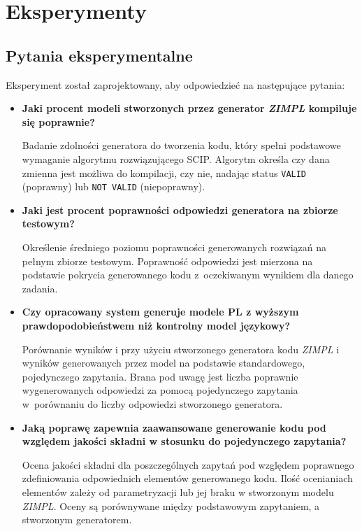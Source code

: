
\chapter{Eksperymenty}\label{ch:experiment}

\section{Pytania eksperymentalne}

Eksperyment został zaprojektowany, aby odpowiedzieć na następujące pytania:
\begin{itemize}
    \item \textbf{Jaki procent modeli stworzonych przez generator  \textit{ZIMPL} kompiluje się poprawnie?}

Badanie zdolności generatora do tworzenia kodu, który spełni podstawowe wymaganie algorytmu rozwiązującego SCIP. Algorytm określa czy dana zmienna jest możliwa do kompilacji, czy nie, nadając status \texttt{VALID} (poprawny) lub \texttt{NOT VALID} (niepoprawny).

    \item \textbf{Jaki jest procent poprawności odpowiedzi generatora na zbiorze testowym?}

 Określenie średniego poziomu poprawności generowanych rozwiązań na pełnym zbiorze testowym. Poprawność odpowiedzi jest mierzona na podstawie pokrycia generowanego kodu z~oczekiwanym wynikiem dla danego zadania.
    
    \item \textbf{Czy opracowany system generuje modele PL z wyższym prawdopodobieństwem niż kontrolny model językowy?}

Porównanie wyników i przy użyciu stworzonego generatora kodu  \textit{ZIMPL} i wyników generowanych przez model na podstawie standardowego, pojedynczego zapytania. Brana pod uwagę jest liczba poprawnie wygenerowanych odpowiedzi za pomocą pojedynczego zapytania w~porównaniu do liczby odpowiedzi stworzonego generatora.
    
    \item \textbf{Jaką poprawę zapewnia zaawansowane generowanie kodu pod względem jakości składni w stosunku do pojedynczego zapytania?}

Ocena jakości składni dla poszczególnych zapytań pod względem poprawnego zdefiniowania odpowiednich elementów generowanego kodu. Ilość ocenianiach elementów zależy od parametryzacji lub jej braku w stworzonym modelu  \textit{ZIMPL}. Oceny są porównywane między podstawowym zapytaniem, a stworzonym generatorem.
    
\end{itemize}

